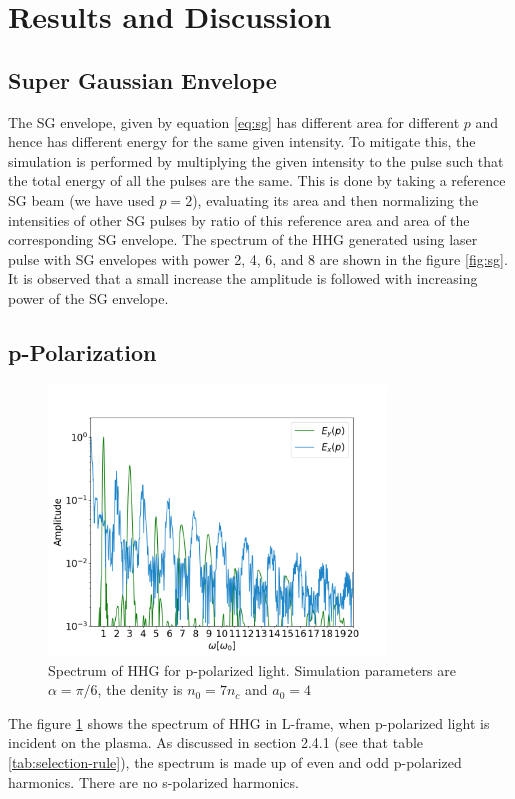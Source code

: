 \documentclass[12pt]{article}
\begin{document}
\section{Results and Discussion}
\subsection{Super Gaussian Envelope}
The SG envelope, given by equation \ref{eq:sg} has different area for different $p$ and hence has different energy for the same given intensity. To mitigate this, the simulation is performed by multiplying the given intensity to the pulse such that the total energy of all the pulses are the same. This is done by taking a reference SG beam (we have used $p=2$), evaluating its area and then normalizing the intensities of other SG pulses by ratio of this reference area and area of the corresponding SG envelope. The spectrum of the HHG generated using laser pulse with SG envelopes with power 2, 4, 6, and 8 are shown in the figure \ref{fig:sg}. It is observed that a small increase the amplitude is followed with increasing power of the SG envelope.

\subsection{p-Polarization}
\begin{figure}[h]
    \centering
    \includegraphics[width=0.8\textwidth]{images/p_fft.png}
    \caption{Spectrum of HHG for p-polarized light. Simulation parameters are $\alpha = \pi/6$, the denity is $n_0 = 7n_c$ and $a_0 = 4$}
    \label{fig:p-fft}
\end{figure}

The figure \ref{fig:p-fft} shows the spectrum of HHG in L-frame, when p-polarized light is incident on the plasma. As discussed in section 2.4.1 (see that table \ref{tab:selection-rule}), the spectrum is made up of even and odd p-polarized harmonics. There are no s-polarized harmonics.
\end{document}
